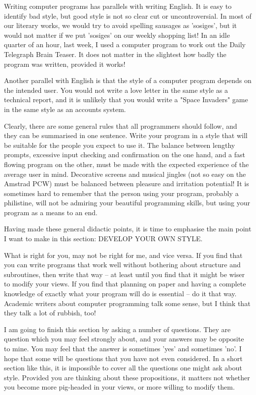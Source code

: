 \documentclass[]{report} %
\begin{document}
Writing  computer programs has parallels with writing English. It is  easy  to 
identify bad style, but good style is not so clear cut or uncontroversial.  In 
most  of  our  literary  works, we would try to  avoid  spelling  sausages  as 
'sosiges', but it would not matter if we put 'sosiges' on our weekly  shopping 
list!  In an idle quarter of an hour, last week, I used a computer program  to 
work out the Daily Telegraph Brain Teaser. It does not matter in the slightest 
how badly the program was written, provided it works!

Another parallel with English is that the style of a computer program  depends 
on the intended user. You would not write a love letter in the same style as a 
technical  report, and it is unlikely that you would write a "Space  Invaders" 
game in the same style as an accounts system.

Clearly, there are some general rules that all programmers should follow,  and 
they  can  be summarised in one sentence. Write your program in a  style  that 
will  be  suitable for the people you expect to use it.  The  balance  between 
lengthy  prompts, excessive input checking and confirmation on the  one  hand, 
and  a  fast  flowing program on the other, must be  made  with  the  expected 
experience of the average user in mind. Decorative screens and musical jingles 
(not  so  easy  on  the Amstrad PCW) must be  balanced  between  pleasure  and 
irritation  potential! It is sometimes hard to remember that the person  using 
your  program,  probably  a philistine, will not be  admiring  your  beautiful 
programming skills, but using your program as a means to an end.

Having  made these general didactic points, it is time to emphasise  the  main 
point I want to make in this section: DEVELOP YOUR OWN STYLE.

What  is right for you, may not be right for me, and vice versa. If  you  find 
that  you can write programs that work well without bothering about  structure 
and subroutines, then write that way -- at least until you find that it  might 
be wiser to modify your views. If you find that planning on paper and having a 
complete knowledge of exactly what your program will do is essential -- do  it 
that  way. Academic writers about computer programming talk some sense, but  I 
think that they talk a lot of rubbish, too!

I  am going to finish this section by asking a number of questions.  They  are 
question  which you may feel strongly about, and your answers may be  opposite 
to mine. You may feel that the answer is sometimes 'yes' and sometimes 'no'. I 
hope that some will be questions that you have not even considered. In a short 
section  like this, it is impossible to cover all the questions one might  ask 
about  style. Provided you are thinking about these propositions,  it  matters 
not  whether  you  become more pig-headed in your views, or  more  willing  to 
modify them.
\end{document}
